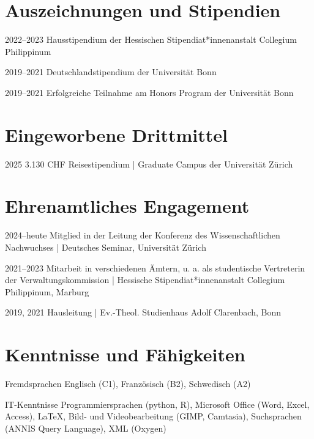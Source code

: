 \documentclass[11pt, a4paper, notopicbreak, titleabove]{simplecv}
\begin{document}
\section{Auszeichnungen und Stipendien}
\begin{topic}

\item[2022--2023]
Hausstipendium der Hessischen Stipendiat*innenanstalt Collegium Philippinum

\item[2019--2021]
Deutschlandstipendium der Universität Bonn

\item[2019--2021]
Erfolgreiche Teilnahme am Honors Program der Universität Bonn

\end{topic}


\section{Eingeworbene Drittmittel}
\begin{topic}
	\item[2025]
	3.130 CHF Reisestipendium {\color{SpotColor}|} Graduate Campus der Universität Zürich  

\end{topic}


\section{Ehrenamtliches Engagement}
\begin{topic}
	\item[2024--heute]
	Mitglied in der Leitung der Konferenz des Wissenschaftlichen Nachwuchses {\color{SpotColor}|} Deutsches Seminar, Universität Zürich

	\item[2021--2023]
	Mitarbeit in verschiedenen Ämtern, u. a. als studentische Vertreterin der Verwaltungskommission {\color{SpotColor}|} Hessische Stipendiat*innenanstalt Collegium Philippinum, Marburg

	\item[2019, 2021]
	Hausleitung {\color{SpotColor}|} Ev.-Theol. Studienhaus Adolf Clarenbach, Bonn

\end{topic}




\section{Kenntnisse und Fähigkeiten}

\begin{topic}

	\item[Fremdsprachen]
	Englisch (C1), Französisch (B2), Schwedisch (A2)

	\item [IT-Kenntnisse]
	Programmiersprachen (python, R), Microsoft Office (Word, Excel, Access), LaTeX, Bild- und Videobearbeitung (GIMP, Camtasia), Suchsprachen (ANNIS Query Language), XML (Oxygen) 


\end{topic}
\end{document}
